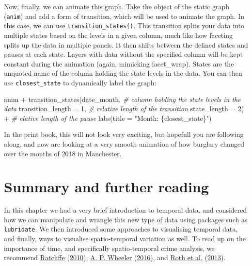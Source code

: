 \documentclass[
  krantz2]{krantz}
\makeatletter
\newenvironment{Shaded}{\begin{snugshade}}{\end{snugshade}}
\newcommand{\AttributeTok}[1]{\textcolor[rgb]{0.61,0.61,0.61}{#1}}
\newcommand{\CommentTok}[1]{\textcolor[rgb]{0.37,0.37,0.37}{\textit{#1}}}
\newcommand{\DecValTok}[1]{\textcolor[rgb]{0.06,0.06,0.06}{#1}}
\newcommand{\FunctionTok}[1]{\textcolor[rgb]{0,0,0}{#1}}
\newcommand{\NormalTok}[1]{#1}
\newcommand{\SpecialCharTok}[1]{\textcolor[rgb]{0,0,0}{#1}}
\newcommand{\StringTok}[1]{\textcolor[rgb]{0.5,0.5,0.5}{#1}}
\newenvironment{kframe}{%
\medskip{}
\setlength{\fboxsep}{.8em}
 \def\at@end@of@kframe{}%
 \ifinner\ifhmode%
  \def\at@end@of@kframe{\end{minipage}}%
  \begin{minipage}{\columnwidth}%
 \fi\fi%
 \def\FrameCommand##1{\hskip\@totalleftmargin \hskip-\fboxsep
 \colorbox{shadecolor}{##1}\hskip-\fboxsep
     \hskip-\linewidth \hskip-\@totalleftmargin \hskip\columnwidth}%
 \MakeFramed {\advance\hsize-\width
   \@totalleftmargin\z@ \linewidth\hsize
   \@setminipage}}%
 {\par\unskip\endMakeFramed%
 \at@end@of@kframe}
\renewenvironment{Shaded}{\begin{kframe}}{\end{kframe}}
\makeatother
\begin{document}
Now, finally, we can animate this graph. Take the object of the static graph (\texttt{anim}) and add a form of transition, which will be used to animate the graph. In this case, we can use \texttt{transition\_states()}. This transition splits your data into multiple states based on the levels in a given column, much like how faceting splits up the data in multiple panels. It then shifts between the defined states and pauses at each state. Layers with data without the specified column will be kept constant during the animation (again, mimicking facet\_wrap). States are the unquoted name of the column holding the state levels in the data. You can then use \texttt{closest\_state} to dynamically label the graph:

\begin{Shaded}
\begin{Highlighting}[]
\NormalTok{anim }\SpecialCharTok{+} 
  \FunctionTok{transition\_states}\NormalTok{(date\_month,  }\CommentTok{\# column holding the state levels in the data}
                    \AttributeTok{transition\_length =} \DecValTok{1}\NormalTok{, }\CommentTok{\# relative length of the transition}
                    \AttributeTok{state\_length =} \DecValTok{2}\NormalTok{) }\SpecialCharTok{+} \CommentTok{\# elative length of the pause }
  \FunctionTok{labs}\NormalTok{(}\AttributeTok{title =} \StringTok{"Month: \{closest\_state\}"}\NormalTok{)}
\end{Highlighting}
\end{Shaded}

In the print book, this will not look very exciting, but hopefull you are following along, and now are looking at a very smooth animation of how burglary changed over the months of 2018 in Manchester.

\hypertarget{summary-and-further-reading-5}{%
\section{Summary and further reading}\label{summary-and-further-reading-5}}

In this chapter we had a very brief introduction to temporal data, and considered how we can manipulate and wrangle this new type of data using packages such as \texttt{lubridate}. We then introduced some approaches to visualising temporal data, and finally, ways to visualise spatio-temporal variation as well. To read up on the importance of time, and specifically spatio-temporal crime analysis, we recommend \protect\hyperlink{ref-Ratcliffe_2010}{Ratcliffe} (\protect\hyperlink{ref-Ratcliffe_2010}{2010}), \protect\hyperlink{ref-Wheeler_2016}{A. P. Wheeler} (\protect\hyperlink{ref-Wheeler_2016}{2016}), and \protect\hyperlink{ref-Roth_2013}{Roth et al.} (\protect\hyperlink{ref-Roth_2013}{2013}).
\end{document}
